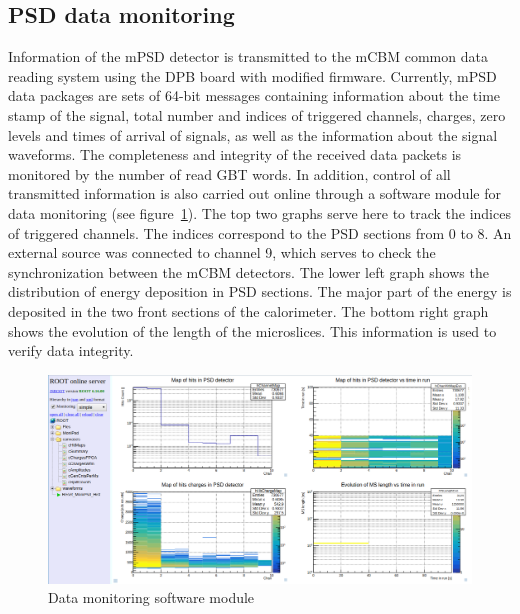 \documentclass[a4paper,11pt]{article}
\begin{document}
\subsection{PSD data monitoring}
Information of the mPSD detector is transmitted to the mCBM common data reading system using the DPB board with modified firmware. Currently, mPSD data packages are sets of 64-bit messages containing information about the time stamp of the signal, total number and indices of triggered channels, charges, zero levels and times of arrival of signals, as well as the information about the signal waveforms.
The completeness and integrity of the received data packets is monitored by the number of read GBT words. In addition, control of all transmitted information is also carried out online through a software module for data monitoring (see figure~\ref{fig:5}). The top two graphs serve here to track the indices of triggered channels. The indices correspond to the PSD sections from 0 to 8. An external source was connected to channel 9, which serves to check the synchronization between the mCBM detectors. The lower left graph shows the distribution of energy deposition in PSD sections. The major part of the energy is deposited in the two front sections of the calorimeter. The bottom right graph shows the evolution of the length of the microslices. This information is used to verify data integrity.

\begin{figure}[htbp]
\centering %
\includegraphics[width=\textwidth]{run582.png}
\caption{\label{fig:5} Data monitoring software module}
\end{figure}
\end{document}
